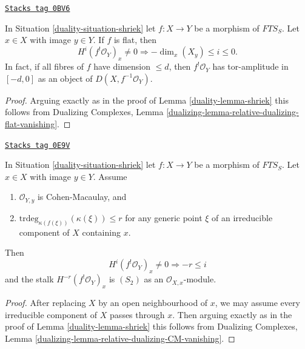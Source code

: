 \begin{lemma}
\label{duality-lemma-flat-shriek}
\href{https://stacks.math.columbia.edu/tag/0BV6}{\texttt{Stacks tag 0BV6}}

In Situation \ref{duality-situation-shriek} let $f : X \to Y$ be a morphism of
$\textit{FTS}_S$. Let $x \in X$ with image $y \in Y$.
If $f$ is flat, then
$$
H^i(f^!\mathcal{O}_Y)_x \not = 0
\Rightarrow - \dim_x(X_y) \leq i \leq 0.
$$
In fact, if all fibres of $f$ have dimension $\leq d$, then
$f^!\mathcal{O}_Y$ has tor-amplitude in $[-d, 0]$ as an object
of $D(X, f^{-1}\mathcal{O}_Y)$.
\end{lemma}

\begin{proof}

Arguing exactly as in the proof of Lemma \ref{duality-lemma-shriek}
this follows from Dualizing Complexes, Lemma
\ref{dualizing-lemma-relative-dualizing-flat-vanishing}.
\end{proof}

\begin{lemma}
\label{duality-lemma-shriek-over-CM}
\href{https://stacks.math.columbia.edu/tag/0E9V}{\texttt{Stacks tag 0E9V}}

In Situation \ref{duality-situation-shriek} let $f : X \to Y$ be a morphism of
$\textit{FTS}_S$. Let $x \in X$ with image $y \in Y$. Assume
\begin{enumerate}
\item $\mathcal{O}_{Y, y}$ is Cohen-Macaulay, and
\item $\text{trdeg}_{\kappa(f(\xi))}(\kappa(\xi)) \leq r$
for any generic point $\xi$ of an irreducible component
of $X$ containing $x$.
\end{enumerate}
Then
$$
H^i(f^!\mathcal{O}_Y)_x \not = 0
\Rightarrow - r \leq i
$$
and the stalk $H^{-r}(f^!\mathcal{O}_Y)_x$ is $(S_2)$ as an
$\mathcal{O}_{X, x}$-module.
\end{lemma}

\begin{proof}

After replacing $X$ by an open neighbourhood of $x$, we may
assume every irreducible component of $X$ passes through $x$.
Then arguing exactly as in the proof of Lemma \ref{duality-lemma-shriek}
this follows from Dualizing Complexes, Lemma
\ref{dualizing-lemma-relative-dualizing-CM-vanishing}.
\end{proof}

